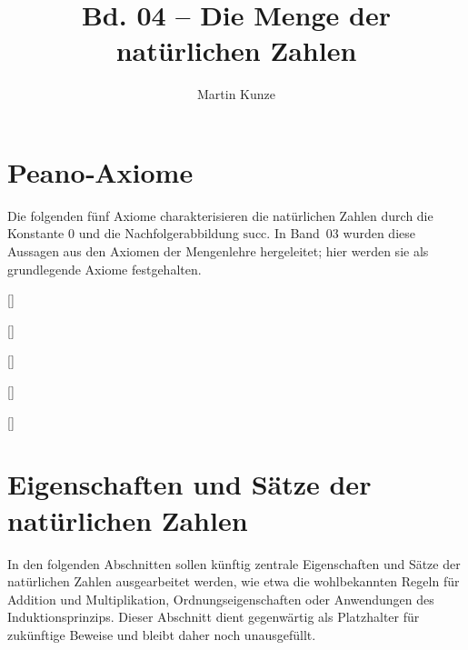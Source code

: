 \documentclass[main.tex]{subfiles}
\title{Bd. 04 – Die Menge der natürlichen Zahlen}
\author{Martin Kunze}
\date{}
\begin{document}
\maketitle
\tableofcontents

\chapter{Peano‑Axiome}

Die folgenden fünf Axiome charakterisieren die natürlichen Zahlen durch die
Konstante \(0\) und die Nachfolgerabbildung \(\mathrm{succ}\).  In Band 03
wurden diese Aussagen aus den Axiomen der Mengenlehre hergeleitet; hier
werden sie als grundlegende Axiome festgehalten.

[]

[]

[]

[]

[]


\chapter{Eigenschaften und Sätze der natürlichen Zahlen}

In den folgenden Abschnitten sollen künftig zentrale Eigenschaften und
Sätze der natürlichen Zahlen ausgearbeitet werden, wie etwa die
wohlbekannten Regeln für Addition und Multiplikation, Ordnungseigenschaften
oder Anwendungen des Induktionsprinzips.  Dieser Abschnitt dient
gegenwärtig als Platzhalter für zukünftige Beweise und bleibt daher
noch unausgefüllt.
\end{document}
